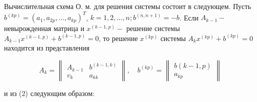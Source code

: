 \documentclass[10pt]{article}
\begin{document}
Вычислительная схема О. м. для решения системы состоит в следующем. Пусть $b^{(k p)}=\left(a_{1}, a_{2 p}, \ldots, a_{k p}\right)^{T}$, $k=1,2, \ldots, n ; b^{(n, n+1)}=-b$. Если $A_{k-1}-$ невырожденная матрица и $x^{(k-1, p)}-$ решение системы $A_{k-1} x^{(k-1, p)}+b^{(k-1, p)}=0$, то решение $x^{(k p)}$ системы $A_{k} x^{(k p)}+b^{(k p)}=0$ находится из представления



\[

A_{k}=\left\|\begin{array}{cc}

A_{k-1} & b^{(k-1, k)} \\

v_{k} & a_{k k}

\end{array}\right\|, \quad b^{(k p)}=\left\|\begin{array}{c}

b(k-1, p) \\

a_{k p}

\end{array}\right\|

\]



и из (2) следующим образом:
\end{document}
